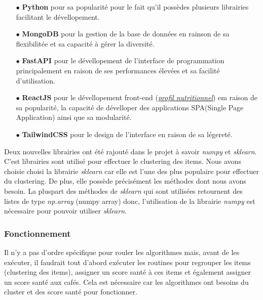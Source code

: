 \documentclass[11pt]{article}
\begin{document}
\begin{itemize}
	\item[$\bullet$] \textbf{Python} pour sa popularité pour le fait qu'il possèdes plusieurs librairies facilitant le dévellopement.\\

	\item[$\bullet$] \textbf{MongoDB} pour la gestion de la base de données en rainson de sa flexibilitée et sa capacité à gérer la diversité.\\
	
	\item[$\bullet$] \textbf{FastAPI} pour le dévellopement de l'interface de programmation principalement en raison de ses performances élevées et sa facilité d'utilisation.\\
	
	\item[$\bullet$] \textbf{ReactJS} pour le dévellopement front-end (\hyperref[profileNutritionnel]{\textit{profil nutritionnel}}) em raison de sa popularité, la capacité de dévelloper des applications SPA(Single Page Application) ainsi que sa modularité.\\
	
	\item[$\bullet$] \textbf{TailwindCSS} pour le design de l'interface en raison de sa légereté.\\
\end{itemize}

Deux nouvelles librairies ont été rajouté dans le projet à savoir \textit{numpy} et \textit{sklearn}. C'est librairies sont utilisé pour effectuer le clustering des items. Nous avons choisie choisi la librairie \textit{sklearn} car elle est l'une des plus populaire pour effectuer du clustering. De plus, elle possède précisément les méthodes dont nous avons besoin. La pluspart des méthodes de \textit{sklearn} qui sont utilisées retournent des listes de type \textit{np.array} (numpy array) donc, l'utilisation de la librairie \textit{numpy} est nécessaire pour pouvoir utiliser \textit{sklearn}.

\subsubsection{Fonctionnement}
Il n'y a pas d'ordre spécifique pour rouler les algorithmes mais, avant de les exécuter, il faudrait tout d'abord exécuter les routines pour regrouper les items (clustering des items), assigner un score santé à ces items et également assigner un score santé aux cafés. Cela est nécessaire car les algorithmes ont besoins du cluster et des score santé pour fonctionner.\\
\end{document}

